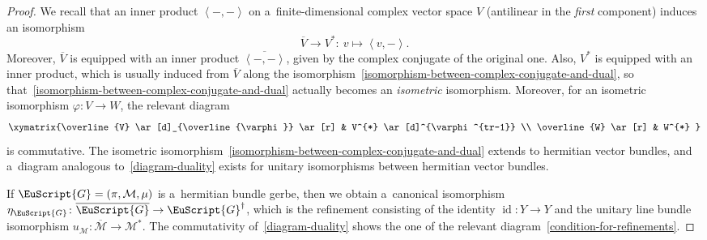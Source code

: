 \documentclass[10pt,a4paper]{amsart}
\numberwithin{equation}{section}
\def\mathscr#1{\EuScript{#1}}
\newcommand{\alxydim}[2]{\begin{aligned}\xymatrix#1{#2}\end{aligned}}
\newcommand{\id}{\operatorname{id}}
\begin{document}
\begin{proof}
We recall that an inner product $\left \langle -,- \right \rangle$ on a~finite-dimensional complex vector space $V$ (antilinear in the \emph{first} component) induces an isomorphism
\begin{equation}
\label{isomorphism-between-complex-conjugate-and-dual}
\overline{V} \to V^{*}\colon\ v \mapsto \left \langle v,- \right \rangle.
\end{equation}
Moreover, $\overline{V}$ is equipped with an inner product $\overline{\left \langle -,- \right \rangle}$, given by the complex conjugate of the original one. Also, $V^{*}$ is equipped with an inner product, which is usually induced from $\overline{V}$ along the isomorphism~\eqref{isomorphism-between-complex-conjugate-and-dual}, so that~\eqref{isomorphism-between-complex-conjugate-and-dual} actually becomes an \emph{isometric} isomorphism. Moreover, for an isometric isomorphism $\varphi\colon V \to W$, the relevant diagram
\begin{equation}
\label{diagram-duality}
\alxydim{}{\overline{V} \ar[d]_{\overline{\varphi}} \ar[r] & V^{*} \ar[d]^{\varphi^{tr-1}} \\ \overline{W} \ar[r] & W^{*} }
\end{equation}
is commutative. The isometric isomorphism~\eqref{isomorphism-between-complex-conjugate-and-dual} extends to hermitian vector bundles, and a~diagram analogous to~\eqref{diagram-duality} exists for unitary isomorphisms between hermitian vector bundles.


If $\mathscr{G}=(\pi,\mathcal{M},\mu)$ is a~hermitian bundle gerbe, then we obtain a~canonical isomorphism $\eta_{\mathscr{G}}\colon \overline{\mathscr{G}} \to \mathscr{G}^{\dagger}$, which is the refinement consisting of the identity $\id\colon Y \to Y$ and the unitary line bundle isomorphism $u_{\mathcal{M}}\colon \overline{\mathcal{M}} \to \mathcal{M}^{*}$. The commutativity of~\eqref{diagram-duality} shows the one of the relevant diagram~\eqref{condition-for-refinements}.


\end{proof}
\end{document}
